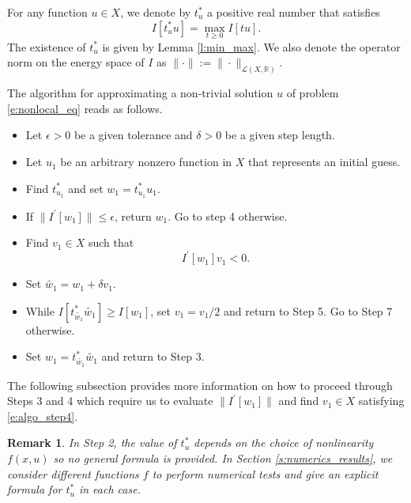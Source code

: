 \documentclass[11pt]{amsart}   	%
\theoremstyle{plain}
\numberwithin{equation}{section}
\newtheorem{remark}[thm]{Remark}
\def\R{\mathbb{R}}
\def\Lin{\mathcal{L}}
\begin{document}
For any function $u \in X$, we denote by $t^*_u$ a positive real number that satisfies
$$I[t^*_u u]  = \max_{t\geq 0} I[tu].$$
The existence of $t^*_u$ is given by Lemma \ref{l:min_max}. We also denote the operator norm on the energy space of $I$ as $\|\cdot\| := \|\cdot\|_{\Lin(X, \R)}$.

The algorithm for approximating a non-trivial solution $u$ of problem \eqref{e:nonlocal_eq} reads as follows.
\begin{itemize}
    \item[0.] Let $\epsilon>0$ be a given tolerance and $\delta>0$ be a given step length.
    
    \item[1.] Let $u_1$ be an arbitrary nonzero function in $X$ that represents an initial guess.
    
    \item[2.] Find $t^*_{u_1}$ and set $w_1 = t^*_{u_1} u_1$.
    
    \item[3.] If $\|I^\prime [w_1] \| \leq \epsilon$, return $w_1$. Go to step 4 otherwise.
    
    \item[4.] Find $v_1 \in X$ such that
    \begin{equation}\label{e:algo_step4}
        I^\prime[w_1] v_1 < 0.
    \end{equation}

    \item[5.] Set $\tilde{w_1} = w_1 + \delta v_1$.
    
    \item[6.] While $I[t^*_{\tilde{w_1}} \tilde{w_1}] \geq I[w_1]$, set $v_1=v_1/2$ and return to Step 5. Go to Step 7 otherwise.
    
    \item[7.] Set $w_1=t^*_{\tilde{w_1}} \tilde{w_1}$ and return to Step 3.
\end{itemize}

The following subsection provides more information on how to proceed through Steps 3 and 4  which require us to evaluate $\|I^\prime[w_1]\|$ and find $v_1\in X$ satisfying \eqref{e:algo_step4}.

\begin{remark}\label{remark:algo_step2}
In Step 2, the value of $t^*_u$ depends on the choice of nonlinearity $f(x,u)$ so no general formula is provided. In Section \ref{s:numerics_results}, we consider different functions $f$ to perform numerical tests and give an explicit formula for $t^*_u$ in each case.
\end{remark}
\end{document}
